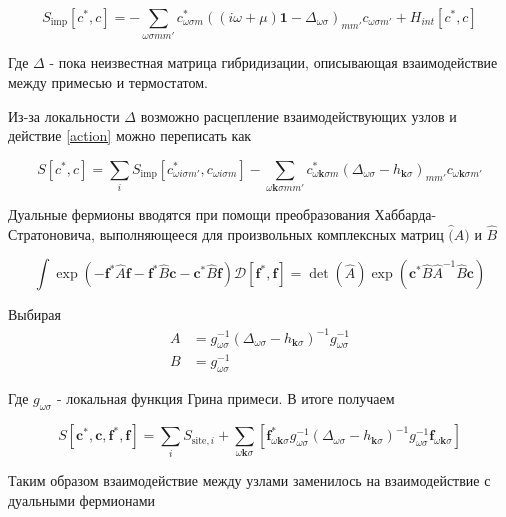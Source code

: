 \documentclass[11pt,a4paper]{report}
\begin{document}
\begin{equation}
 S_{\text{imp}}[c^*,c] = - \sum_{\omega\sigma m m'}c^*_{\omega\sigma m}((i\omega+\mu)\mathbf{1}-\Delta_{\omega\sigma})_{mm'}c_{\omega\sigma m'} + H_{int}[c^*,c]
\end{equation}

Где $\Delta$ - пока неизвестная матрица гибридизации, описывающая взаимодействие между примесью и термостатом.

Из-за локальности $\Delta$ возможно расцепление взаимодействующих узлов и действие \ref{action} можно переписать как

\begin{equation}
 S[c^*,c] = \sum_i S_{\text{imp}}[c^*_{\omega i \sigma m'},c_{\omega i\sigma m}] - \sum_{\omega\mathbf{k}\sigma mm'}c^*_{\omega\mathbf{k}\sigma m}(\Delta_{\omega\sigma}-h_{\mathbf{k}\sigma})_{mm'}c_{\omega\mathbf{k}\sigma m'}
\end{equation}

Дуальные фермионы вводятся при помощи преобразования Хаббарда-Стратоновича, выполняющееся для произвольных комплексных матриц $\hat(A)$ и $\hat{B}$

\begin{equation}
 \int \exp{(-\mathbf{f}^*\hat{A}\mathbf{f}-\mathbf{f}^*\hat{B}\mathbf{c}-\mathbf{c}^*\hat{B}\mathbf{f})}\mathcal{D}[\mathbf{f}^*,\mathbf{f}] = \det{(\hat{A})}\exp{(\mathbf{c}^*\hat{B}\hat{A}^{-1}\hat{B}\mathbf{c})}
\end{equation}

Выбирая 
\begin{equation}
\begin{split}
 A &= g_{\omega\sigma}^{-1}(\Delta_{\omega\sigma}-h_{\mathbf{k}\sigma})^{-1} g_{\omega\sigma}^{-1} \\
 B &= g_{\omega\sigma}^{-1}
\end{split}
\end{equation}

Где $g_{\omega\sigma}$ - локальная функция Грина примеси. В итоге получаем

\begin{equation}
 S[\mathbf{c}^*,\mathbf{c},\mathbf{f}^*,\mathbf{f}] = \sum_i S_{\text{site},i} + \sum_{\omega\mathbf{k}\sigma}
 \left[\mathbf{f}^*_{\omega\mathbf{k}\sigma} g_{\omega\sigma}^{-1}(\Delta_{\omega\sigma}-h_{\mathbf{k}\sigma})^{-1} g_{\omega\sigma}^{-1}\mathbf{f}_{\omega\mathbf{k}\sigma}\right]
\end{equation}

Таким образом взаимодействие между узлами заменилось на взаимодействие с дуальными фермионами
\end{document}
